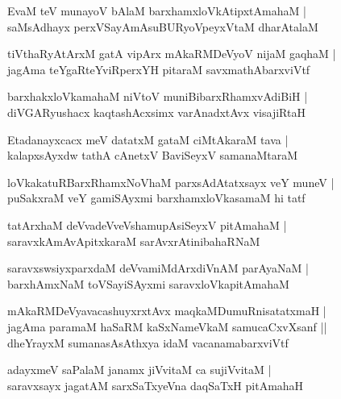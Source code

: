 \begin{shloka}
EvaM teV munayoV bAlaM barxhamxloVkAtipxtAmahaM |\\
saMsAdhayx perxVSayAmAsuBURyoVpeyxVtaM dharAtalaM
\end{shloka}

\begin{shloka}
tiVthaRyAtArxM gatA vipArx mAkaRMDeVyoV nijaM gaqhaM |\\
jagAma teYgaRteYviRperxYH pitaraM savxmathAbarxviVtf 
\end{shloka}

\begin{shloka}
barxhakxloVkamahaM niVtoV muniBibarxRhamxvAdiBiH |\\
diVGARyushacx kaqtashAcxsimx varAnadxtAvx visajiRtaH 
\end{shloka}

\begin{shloka}
Etadanayxcacx meV datatxM gataM ciMtAkaraM tava |\\
kalapxsAyxdw tathA cAnetxV BaviSeyxV samanaMtaraM 
\end{shloka}

\begin{shloka}
loVkakatuRBarxRhamxNoVhaM parxsAdAtatxsayx veY muneV |\\
puSakxraM veY gamiSAyxmi barxhamxloVkasamaM hi tatf 
\end{shloka}

\begin{shloka}
tatArxhaM deVvadeVveVshamupAsiSeyxV pitAmahaM |\\
saravxkAmAvApitxkaraM sarAvxrAtinibahaRNaM
\end{shloka}

\begin{shloka}
saravxswsiyxparxdaM deVvamiMdArxdiVnAM parAyaNaM |\\
barxhAmxNaM toVSayiSAyxmi saravxloVkapitAmahaM 
\end{shloka}

\begin{shloka}
mAkaRMDeVyavacashuyxrxtAvx maqkaMDumuRnisatatxmaH |\\
jagAma paramaM haSaRM kaSxNameVkaM samucaCxvXsanf ||\\
dheYrayxM sumanasAsAthxya idaM vacanamabarxviVtf
\end{shloka}

\begin{shloka}
adayxmeV saPalaM janamx jiVvitaM ca sujiVvitaM |\\
saravxsayx jagatAM sarxSaTxyeVna daqSaTxH pitAmahaH
\end{shloka}

